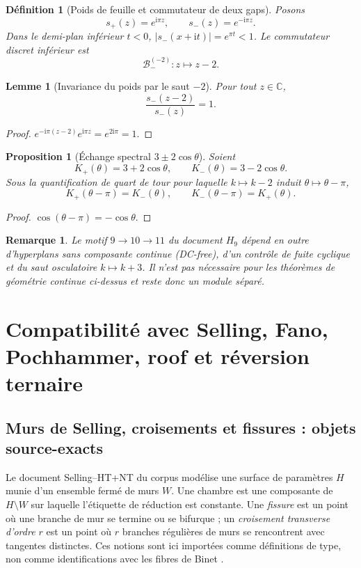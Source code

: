 \documentclass[11pt,a4paper]{article}
\newtheorem{proposition}[theorem]{Proposition}
\newtheorem{lemma}[theorem]{Lemme}
\newtheorem{definition}[theorem]{Définition}
\newtheorem{remark}[theorem]{Remarque}
\newcommand{\C}{\mathbb C}
\newcommand{\ii}{\mathrm i}
\begin{document}
\begin{definition}[Poids de feuille et commutateur de deux gaps]
Posons
\[
 s_+(z)=e^{\ii\pi z},\qquad s_-(z)=e^{-\ii\pi z}.
\]
Dans le demi-plan inférieur $t<0$, $|s_-(x+\ii t)|=e^{\pi t}<1$. Le commutateur discret inférieur est
\[
 \mathcal B_-^{(-2)}:z\longmapsto z-2.
\]
\end{definition}

\begin{lemma}[Invariance du poids par le saut $-2$]
Pour tout $z\in\C$,
\[
 \frac{s_-(z-2)}{s_-(z)}=1.
\]
\end{lemma}

\begin{proof}
$e^{-\ii\pi(z-2)}e^{\ii\pi z}=e^{2\ii\pi}=1$.
\end{proof}

\begin{proposition}[Échange spectral $3\pm2\cos\theta$]
Soient
\[
 K_+(\theta)=3+2\cos\theta,
 \qquad
 K_-(\theta)=3-2\cos\theta.
\]
Sous la quantification de quart de tour pour laquelle $k\mapsto k-2$ induit $\theta\mapsto\theta-\pi$,
\[
 K_+(\theta-\pi)=K_-(\theta),
 \qquad
 K_-(\theta-\pi)=K_+(\theta).
\]
\end{proposition}

\begin{proof}
$\cos(\theta-\pi)=-\cos\theta$.
\end{proof}

\begin{remark}
Le motif $9\to10\to11$ du document $H_9$ dépend en outre d'hyperplans sans composante continue (DC-free), d'un contrôle de fuite cyclique et du saut osculatoire $k\mapsto k+3$. Il n'est pas nécessaire pour les théorèmes de géométrie continue ci-dessus et reste donc un module séparé.
\end{remark}

\section{Compatibilité avec Selling, Fano, Pochhammer, roof et réversion ternaire}

\subsection{Murs de Selling, croisements et fissures : objets source-exacts}

Le document Selling--HT+NT du corpus modélise une surface de paramètres $H$ munie d'un ensemble fermé de murs $W$. Une chambre est une composante de $H\setminus W$ sur laquelle l'étiquette de réduction est constante. Une \emph{fissure} est un point où une branche de mur se termine ou se bifurque ; un \emph{croisement transverse d'ordre $r$} est un point où $r$ branches régulières de murs se rencontrent avec tangentes distinctes. Ces notions sont ici importées comme définitions de type, non comme identifications avec les fibres de Binet \cite{SellingHTNT}.
\end{document}
